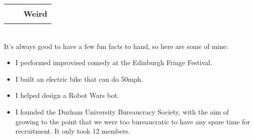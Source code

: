 \documentclass[hidelinks, 12pt, a4paper]{article}
\begin{document}
	\begin{tabularx}{\textwidth}{@{}Xrr@{}}&
		\rule{50pt}{1pt}&
		\textbf{Weird}
	\end{tabularx}\\

	It's always good to have a few fun facts to hand, so here are some of mine:
	
	\begin{itemize}
		\item \begin{small}I performed improvised comedy at the Edinburgh Fringe Festival.\end{small}
		
		\item \begin{small}I built an electric bike that can do 50mph.\end{small}
		
		\item \begin{small}I helped design a Robot Wars bot.\end{small}
		
		\item \begin{small}I founded the Durham University Bureaucracy Society, with the aim of growing to the point that we were too bureaucratic to have any spare time for recruitment. It only took 12 members.\end{small}
	\end{itemize}
\end{document}
